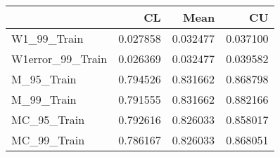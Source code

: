\begin{tabular}{lrrr}
\toprule
{} &        CL &      Mean &        CU \\
\midrule
W1\_99\_Train      &  0.027858 &  0.032477 &  0.037100 \\
W1error\_99\_Train &  0.026369 &  0.032477 &  0.039582 \\
M\_95\_Train       &  0.794526 &  0.831662 &  0.868798 \\
M\_99\_Train       &  0.791555 &  0.831662 &  0.882166 \\
MC\_95\_Train      &  0.792616 &  0.826033 &  0.858017 \\
MC\_99\_Train      &  0.786167 &  0.826033 &  0.868051 \\
\bottomrule
\end{tabular}
